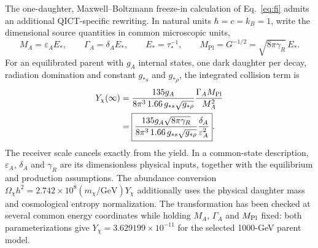 The one-daughter, Maxwell--Boltzmann freeze-in calculation of Eq.~\eqref{eq:fi} admits an additional QICT-specific rewriting. In natural units $\hbar=c=k_B=1$, write the dimensional source quantities in common microscopic units,
\begin{equation}
M_A=\varepsilon_AE_*,\qquad\Gamma_A=\delta_AE_*,\qquad
E_*=\tau_*^{-1},\qquad M_{\mathrm{Pl}}=G^{-1/2}=\sqrt{8\pi\gamma_R}\,E_*.
\end{equation}
For an equilibrated parent with $g_A$ internal states, one dark daughter per decay, radiation domination and constant $g_{*s}$ and $g_{*\rho}$, the integrated collision term is
\begin{align}
Y_\chi(\infty)&=\frac{135g_A}{8\pi^3\,1.66\,g_{*s}\sqrt{g_{*\rho}}}\frac{\Gamma_A M_{\rm Pl}}{M_A^2}\\
&=\boxed{\frac{135g_A\sqrt{8\pi\gamma_R}}{8\pi^3\,1.66\,g_{*s}\sqrt{g_{*\rho}}}\frac{\delta_A}{\varepsilon_A^2}}.\label{eq:operator-fi-scale}
\end{align}
The receiver scale cancels exactly from the yield. In a common-state description, $\varepsilon_A$, $\delta_A$ and $\gamma_R$ are its dimensionless physical inputs, together with the equilibrium and production assumptions. The abundance conversion $\Omega_\chi h^2=2.742\times10^8(m_\chi/\mathrm{GeV})Y_\chi$ additionally uses the physical daughter mass and cosmological entropy normalization. The transformation has been checked at several common energy coordinates while holding $M_A$, $\Gamma_A$ and $M_{\rm Pl}$ fixed: both parameterizations give $Y_\chi=3.629199\times10^{-11}$ for the selected 1000-GeV parent model.


